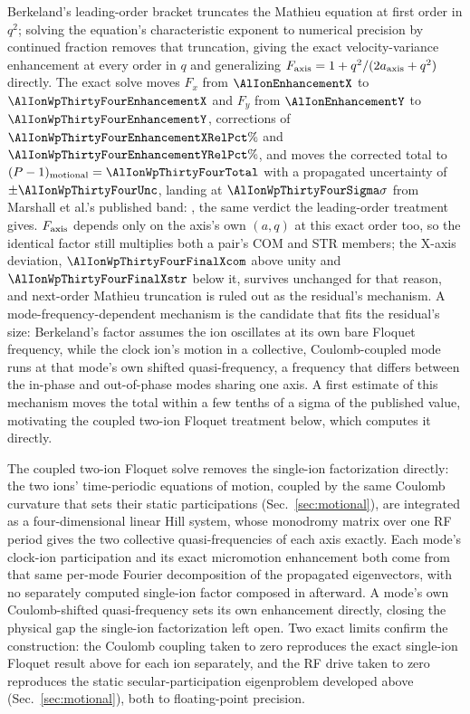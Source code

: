 \documentclass[aps,pra,superscriptaddress,groupedaddress,nofootinbib]{revtex4-2}
\begin{document}
Berkeland's leading-order bracket truncates the Mathieu equation at first
order in $q^2$; solving the equation's characteristic exponent to numerical
precision by continued fraction removes that truncation, giving the exact
velocity-variance enhancement at every order in $q$ and generalizing
$F_{\rm axis}=1+q^2/(2a_{\rm axis}+q^2)$ directly. The exact solve moves
$F_x$ from $\AlIonEnhancementX$ to $\AlIonWpThirtyFourEnhancementX$ and
$F_y$ from $\AlIonEnhancementY$ to $\AlIonWpThirtyFourEnhancementY$,
corrections of $\AlIonWpThirtyFourEnhancementXRelPct\%$ and
$\AlIonWpThirtyFourEnhancementYRelPct\%$, and moves the corrected total to
$(P-1)_{\rm motional}=\AlIonWpThirtyFourTotal$ with a propagated
uncertainty of $\pm\AlIonWpThirtyFourUnc$, landing at
$\AlIonWpThirtyFourSigma\sigma$ from Marshall et al.'s published band:
\textit{\AlIonWpThirtyFourVerdict}, the same verdict the leading-order
treatment gives. $F_{\rm axis}$ depends only on the axis's own $(a,q)$ at
this exact order too, so the identical factor still multiplies both a
pair's COM and STR members; the X-axis deviation,
$\AlIonWpThirtyFourFinalXcom$ above unity and $\AlIonWpThirtyFourFinalXstr$
below it, survives unchanged for that reason, and next-order Mathieu
truncation is ruled out as the residual's mechanism. A mode-frequency-dependent
mechanism is the candidate that fits the residual's size:
Berkeland's factor assumes the ion oscillates at its own bare Floquet
frequency, while the clock ion's motion in a collective, Coulomb-coupled
mode runs at that mode's own shifted quasi-frequency, a frequency that
differs between the in-phase and out-of-phase modes sharing one axis. A
first estimate of this mechanism moves the total within a few tenths of a
sigma of the published value, motivating the coupled two-ion Floquet
treatment below, which computes it directly.

The coupled two-ion Floquet solve removes the single-ion factorization
directly: the two ions' time-periodic equations of motion, coupled by the
same Coulomb curvature that sets their static participations
(Sec.~\ref{sec:motional}), are integrated as a four-dimensional linear
Hill system, whose monodromy matrix over one RF period gives the two
collective quasi-frequencies of each axis exactly. Each mode's clock-ion
participation and its exact micromotion enhancement both come from that
same per-mode Fourier decomposition of the propagated eigenvectors, with
no separately computed single-ion factor composed in afterward. A mode's
own Coulomb-shifted quasi-frequency sets its own enhancement directly,
closing the physical gap the single-ion factorization left open. Two exact
limits confirm the construction: the Coulomb coupling taken to zero
reproduces the exact single-ion Floquet result above for each ion
separately, and the RF drive taken to zero reproduces the static
secular-participation eigenproblem developed above (Sec.~\ref{sec:motional}),
both to floating-point precision.
\end{document}
